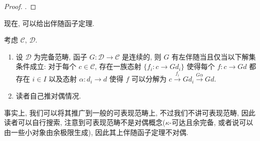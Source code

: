 \begin{proof}
    \cite[命题 1.11.4]{李文威卷二}.
\end{proof}
现在, 可以给出伴随函子定理.
\begin{theorem}
    考虑 $\mathcal{C}$, $\mathcal{D}$.
    \begin{enumerate}
        \item 设 $\mathcal{D}$ 为完备范畴, 函子 $G \colon \mathcal{D} \to \mathcal{C}$ 是连续的, 则 $G$ 有左伴随当且仅当以下解集条件成立: 对于每个 $c \in \mathcal{C}$, 存在一族态射 $\{f_i \colon c \to Gd_i\}$ 使得每个 $f \colon c \to Gd$ 都存在 $i \in I$ 以及态射 $\alpha \colon d_i \to d$ 使得 $f$ 可以分解为 $c \xrightarrow{f_i}Gd_i \xrightarrow{G\alpha}Gd$.
        \item 读者自己推对偶情况.
    \end{enumerate}
\end{theorem}
事实上, 我们可以将其推广到一般的可表现范畴上, 不过我们不讲可表现范畴, 因此读者可以自行搜索, 注意到可表现范畴不是对偶概念($\kappa$-可达且余完备, 或者说可以由一些小对象由余极限生成), 因此其上伴随函子定理不对偶.
